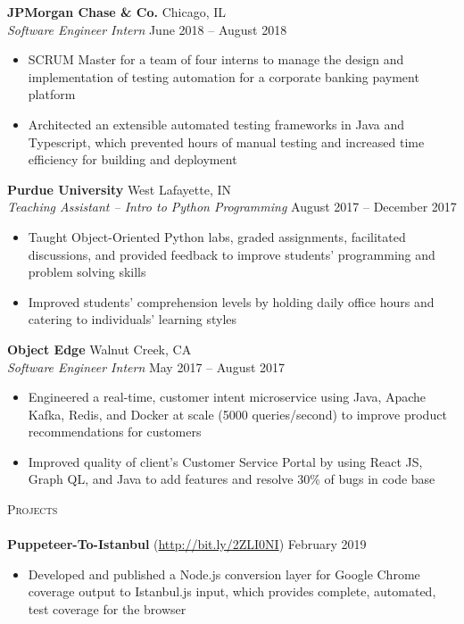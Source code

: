 \documentclass[letterpaper, 10pt]{article}
\newcommand{\lineunder} {
    \vspace*{-8pt} \\
    \hspace*{-18pt} \hrulefill \\
}
\newcommand{\header} [1] {
    {
        \hspace*{-18pt}\vspace*{6pt}
        {\large\textsc{#1}}
    }
    \vspace*{-6pt} \lineunder
}
\begin{document}
\textbf{JPMorgan Chase \& Co.} \hfill Chicago, IL\\
\textit{Software Engineer Intern} \hfill June 2018 -- August 2018\\
\vspace{-1mm}
\begin{itemize} \itemsep 1pt
    \item SCRUM Master for a team of four interns to manage the design and implementation of testing automation for a corporate banking payment platform
    \item Architected an extensible automated testing frameworks in Java and Typescript, which prevented hours of manual testing and increased time efficiency for building and deployment
\end{itemize}

\textbf{Purdue University} \hfill West Lafayette, IN\\
\textit{Teaching Assistant -- Intro to Python Programming} \hfill August 2017 -- December 2017\\
\vspace{-1mm}
\begin{itemize} \itemsep 1pt
    \item Taught Object-Oriented Python labs, graded assignments, facilitated discussions, and provided feedback to improve students’ programming and problem solving skills
    \item Improved students’ comprehension levels by holding daily office hours and catering to individuals’ learning styles
\end{itemize}

\textbf{Object Edge} \hfill Walnut Creek, CA\\
\textit{Software Engineer Intern} \hfill May 2017 -- August 2017\\
\vspace{-1mm}
\begin{itemize} \itemsep 1pt
    \item Engineered a real-time, customer intent microservice using Java, Apache Kafka, Redis, and Docker at scale (5000 queries/second) to improve product recommendations for customers
    \item Improved quality of client’s Customer Service Portal by using React JS, Graph QL, and Java to add features and resolve 30\% of bugs in code base
\end{itemize}

\header{Projects}
{\textbf{Puppeteer-To-Istanbul}} (\href{http://bit.ly/2ZLI0NI}{http://bit.ly/2ZLI0NI}) \hfill February 2019\\
\vspace{-1mm}
\begin{itemize} \itemsep 1pt
    \item Developed and published a Node.js conversion layer for Google Chrome coverage output to Istanbul.js input, which provides complete, automated, test coverage for the browser
\end{itemize}
\vspace*{2mm}
\end{document}
